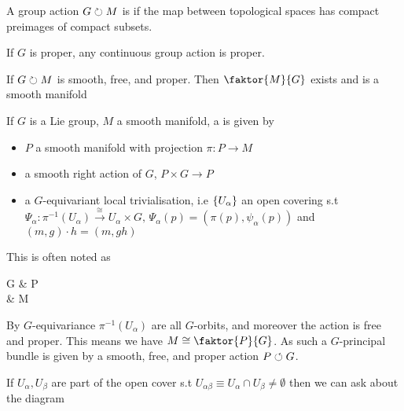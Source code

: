 \documentclass{article}
\begin{document}
\begin{definition}
A group action $G \circlearrowright M$ is  if the map between topological spaces 
has compact preimages of compact subsets. 
\end{definition}

\begin{prop}
If $G$ is proper, any continuous group action is proper. 
\end{prop}

\begin{lemma}
If $G \circlearrowright M$ is smooth, free, and proper. Then $\faktor{M}{G}$ exists and is a smooth manifold
\end{lemma}

\begin{definition}
If $G$ is a Lie group, $M$ a smooth manifold, a  is given by 
\begin{itemize}
    \item $P$ a smooth manifold with projection $\pi:P \to M$
    \item a smooth right action of $G$, $P \times G \to P$
    \item a $G$-equivariant local trivialisation, i.e $\left\{ U_\alpha \right\}$ an open covering s.t $\Psi_\alpha : \pi^{-1}(U_\alpha) \overset{\cong}{\to} U_\alpha \times G, \, \Psi_\alpha(p) = (\pi(p),\psi_\alpha(p))$ and $(m,g) \cdot h = (m,gh)$
\end{itemize}
This is often noted as 
\begin{tkz}
G \arrow[r] & P \arrow[d,"\pi"] \\ & M
\end{tkz}
\end{definition}

\begin{remark}
By $G$-equivariance $\pi^{-1}(U_\alpha)$ are all $G$-orbits, and moreover the action is free and proper. This means we have $M \cong \faktor{P}{G}$. As such a $G$-principal bundle is given by a smooth, free, and proper action $P \circlearrowleft G$. 
\end{remark}

If $U_\alpha,U_\beta$ are part of the open cover s.t $U_{\alpha\beta} \equiv U_\alpha \cap U_\beta \neq \emptyset$ then we can ask about the diagram
\begin{center}
\end{center}
\end{document}
